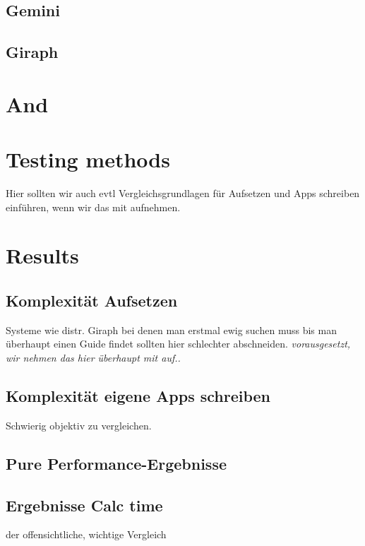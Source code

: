 \documentclass[conference,a4paper]{IEEEtran}
\begin{document}
\subsection{Gemini}


\subsection{Giraph}


\section{And}

\section{Testing methods}


Hier sollten wir auch evtl Vergleichsgrundlagen für Aufsetzen und Apps schreiben einführen, wenn wir das mit aufnehmen.


\section{Results}
\subsection{Komplexität Aufsetzen}
Systeme wie distr. Giraph bei denen man erstmal ewig suchen muss bis man überhaupt einen Guide findet sollten hier schlechter abschneiden. \emph{vorausgesetzt, wir nehmen das hier überhaupt mit auf..}

\subsection{Komplexität eigene Apps schreiben}
Schwierig objektiv zu vergleichen.


\subsection{Pure Performance-Ergebnisse}

\subsection{Ergebnisse Calc time}
der offensichtliche, wichtige Vergleich
\end{document}
